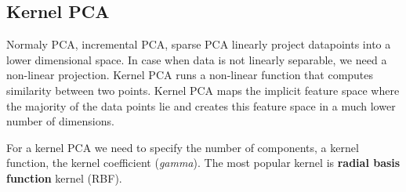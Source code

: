\documentclass[11pt]{article}
\begin{document}
    \subsection{Kernel PCA}\label{kernel-pca}

Normaly PCA, incremental PCA, sparse PCA linearly project datapoints
into a lower dimensional space. In case when data is not linearly
separable, we need a non-linear projection. Kernel PCA runs a non-linear
function that computes similarity between two points. Kernel PCA maps
the implicit feature space where the majority of the data points lie and
creates this feature space in a much lower number of dimensions.

For a kernel PCA we need to specify the number of components, a kernel
function, the kernel coefficient (\emph{gamma}). The most popular kernel
is \textbf{radial basis function} kernel (RBF).
\end{document}
